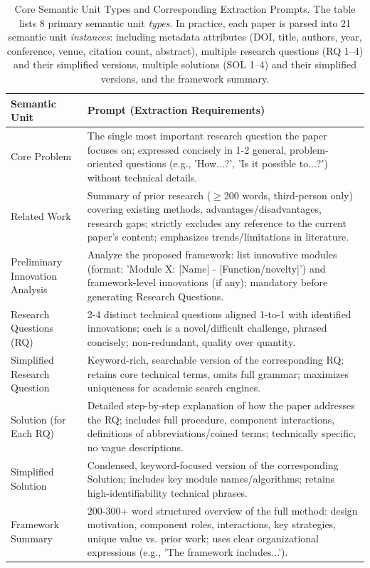 \documentclass[runningheads]{llncs}
\begin{document}
\begin{table}[h]
\centering
\setlength\tabcolsep{6pt}
\renewcommand{\arraystretch}{1.4}
\small
\begin{tabular}{p{3.5cm}p{9.5cm}}
\toprule
\textbf{Semantic Unit} & \textbf{Prompt (Extraction Requirements)} \\
\midrule
Core Problem & The single most important research question the paper focuses on; expressed concisely in 1-2 general, problem-oriented questions (e.g., 'How...?', 'Is it possible to...?') without technical details. \\
\midrule
Related Work & Summary of prior research ($\geq$200 words, third-person only) covering existing methods, advantages/disadvantages, research gaps; strictly excludes any reference to the current paper's content; emphasizes trends/limitations in literature. \\
\midrule
Preliminary Innovation Analysis & Analyze the proposed framework: list innovative modules (format: 'Module X: [Name] - [Function/novelty]') and framework-level innovations (if any); mandatory before generating Research Questions. \\
\midrule
Research Questions (RQ) & 2-4 distinct technical questions aligned 1-to-1 with identified innovations; each is a novel/difficult challenge, phrased concisely; non-redundant, quality over quantity. \\
\midrule
Simplified Research Question & Keyword-rich, searchable version of the corresponding RQ; retains core technical terms, omits full grammar; maximizes uniqueness for academic search engines. \\
\midrule
Solution (for Each RQ) & Detailed step-by-step explanation of how the paper addresses the RQ; includes full procedure, component interactions, definitions of abbreviations/coined terms; technically specific, no vague descriptions. \\
\midrule
Simplified Solution & Condensed, keyword-focused version of the corresponding Solution; includes key module names/algorithms; retains high-identifiability technical phrases. \\
\midrule
Framework Summary & 200-300+ word structured overview of the full method: design motivation, component roles, interactions, key strategies, unique value vs. prior work; uses clear organizational expressions (e.g., 'The framework includes...'). \\
\bottomrule
\end{tabular}
\caption{Core Semantic Unit Types and Corresponding Extraction Prompts. The table lists 8 primary semantic unit \textit{types}. In practice, each paper is parsed into 21 semantic unit \textit{instances}: including metadata attributes (DOI, title, authors, year, conference, venue, citation count, abstract), multiple research questions (RQ 1--4) and their simplified versions, multiple solutions (SOL 1--4) and their simplified versions, and the framework summary.}
\label{tab:semantic_prompt_extraction}
\end{table}
\end{document}
